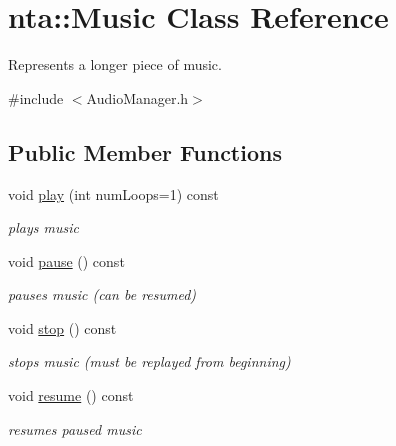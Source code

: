 \hypertarget{classnta_1_1Music}{}\section{nta\+:\+:Music Class Reference}
\label{classnta_1_1Music}


Represents a longer piece of music.  




{\ttfamily \#include $<$Audio\+Manager.\+h$>$}

\subsection*{Public Member Functions}
\begin{DoxyCompactItemize}
\item 
\mbox{\label{classnta_1_1Music_a2987f4f84b0c0a0094967821a7b14f64}} 
void \hyperlink{classnta_1_1Music_a2987f4f84b0c0a0094967821a7b14f64}{play} (int num\+Loops=1) const
\begin{DoxyCompactList}\small\item\em plays music \end{DoxyCompactList}\item 
\mbox{\label{classnta_1_1Music_a8382cffd123f37f3f1426a0d461e9541}} 
void \hyperlink{classnta_1_1Music_a8382cffd123f37f3f1426a0d461e9541}{pause} () const
\begin{DoxyCompactList}\small\item\em pauses music (can be resumed) \end{DoxyCompactList}\item 
\mbox{\label{classnta_1_1Music_ade2d11ebc9273494b344e089cd7b58b8}} 
void \hyperlink{classnta_1_1Music_ade2d11ebc9273494b344e089cd7b58b8}{stop} () const
\begin{DoxyCompactList}\small\item\em stops music (must be replayed from beginning) \end{DoxyCompactList}\item 
\mbox{\label{classnta_1_1Music_a7eb8159db905f34ebf6ad48ec9a1afa1}} 
void \hyperlink{classnta_1_1Music_a7eb8159db905f34ebf6ad48ec9a1afa1}{resume} () const
\begin{DoxyCompactList}\small\item\em resumes paused music \end{DoxyCompactList}\end{DoxyCompactItemize}
